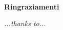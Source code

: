 
\newpage 

\ %

\newpage

\begin{center}
  {\bf \Huge Ringraziamenti}
\end{center}

\vspace{4cm}


\emph{
  ...thanks to...
}


